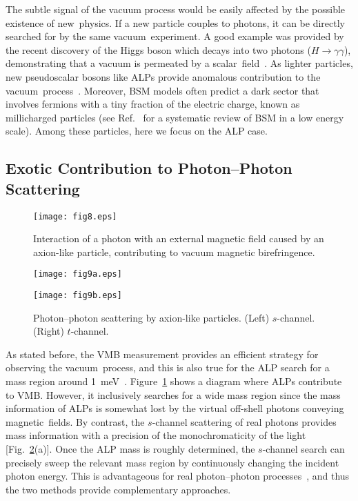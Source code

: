 \documentclass[10pt,a4paper]{article}%
\begin{document}
The subtle signal of the vacuum process would be easily affected by the possible existence of new~physics.
If a new particle couples to photons, it can be directly searched for by the same vacuum~experiment.
A good example was provided by the recent discovery of the Higgs boson which decays into two photons ($H \to \gamma \gamma$), demonstrating that a vacuum is permeated by a scalar~field~\mbox{\cite{higgs_atl,higgs_cms}.}
As lighter particles, new pseudoscalar bosons like ALPs provide anomalous contribution to the vacuum~process~\cite{axion_review}.
Moreover, BSM models often predict a dark sector that involves fermions with a tiny fraction of the electric charge, known as millicharged particles (see Ref.~\cite{snow_mass} for a systematic review of BSM in a low energy scale).
Among these particles, here we focus on the ALP case.

\subsection{Exotic Contribution to Photon--Photon Scattering}\label{subsec:exotic}

\begin{figure}[!t]
\centering
\texttt{[image: fig8.eps]}
\caption{
Interaction of a photon with an external magnetic field caused by an axion-like particle, contributing to vacuum magnetic birefringence.
\label{fig:alp_vmb}}
\end{figure}   

\begin{figure}[!t]
\begin{minipage}{0.5\hsize}
\centering
\texttt{[image: fig9a.eps]}
\end{minipage}
\begin{minipage}{0.5\hsize}
\centering
\texttt{[image: fig9b.eps]}
\end{minipage}
\caption{
Photon--photon scattering by axion-like particles.
(Left) $s$-channel.
(Right) $t$-channel.
\label{fig:alp_gg}}
\end{figure}   

As stated before, the VMB measurement provides an efficient strategy for observing the vacuum~process, and this is also true for the ALP search for a mass region around 1~meV~\cite{pvlas}.
Figure~\ref{fig:alp_vmb} shows a diagram where ALPs contribute to VMB.
However, it inclusively searches for a wide mass region since the mass information of ALPs is somewhat lost by the virtual off-shell photons conveying magnetic~fields.
By contrast, the $s$-channel scattering of real photons provides mass information with a precision of the monochromaticity of the light [Fig.~\ref{fig:alp_gg}(a)].
Once the ALP mass is roughly determined, the $s$-channel search can precisely sweep the relevant mass region by continuously changing the incident photon energy.
This is advantageous for real photon--photon processes~\cite{gg1, gg2}, and thus the two methods provide complementary approaches.
\end{document}
